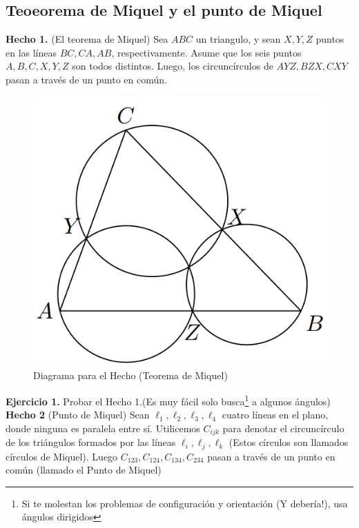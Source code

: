 \documentclass[11pt, a4paper]{article}
\begin{document}
\begin{enumerate}
\section{Teoeorema de Miquel y el punto de Miquel}
\textbf{Hecho 1.} (El teorema de Miquel) Sea $ABC$ un triangulo, y sean $X, Y, Z$ puntos en las l\'ineas $BC, CA, AB$, respectivamente. Asume que los seis puntos $A, B, C, X, Y, Z$ son todos distintos. Luego, los circunc\'irculos de $AYZ, BZX, CXY$ pasan a trav\'es de un punto en com\'un.
\begin{figure}[h]
	\centering
	\includegraphics[scale=0.3]{p3.1}
	\caption{Diagrama para el Hecho (Teorema de Miquel)}
\end{figure}
\end{enumerate}
\textbf{Ejercicio 1.} Probar el Hecho 1.(Es muy f\'acil solo busca\footnote{Si te molestan los problemas de configuraci\'on y orientaci\'on (Y deber\'ia!), usa \'angulos dirigidos} a algunos \'angulos)\\

\textbf{Hecho 2} (Punto de Miquel) Sean $\ell_1, \ell_2, \ell_3, \ell_4$ cuatro l\'ineas en el plano, donde ninguna es paralela entre s\'i. Utilicemos $C_{ijk}$ para denotar el circunc\'irculo de los tri\'angulos formados por las l\'ineas $\ell_i, \ell_j, \ell_k$ (Estos c\'irculos son llamados c\'irculos de Miquel). Luego $C_{123}, C_{124}, C_{134}, C_{234}$ pasan a trav\'es de un punto en com\'un (llamado el Punto de Miquel)\\
\end{document}
